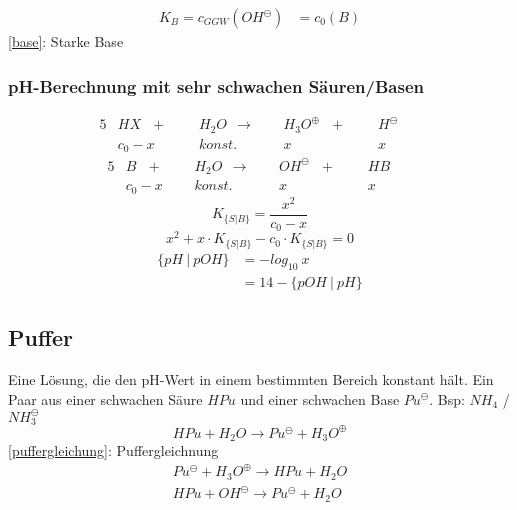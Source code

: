 {\large
	\begin{equation}
	\label{base}
	\begin{split}
	K_B=c_{GGW}(OH^\ominus) &= c_0(B)
	\end{split}
	\end{equation}	
}
\ref{base}: Starke Base
\subsubsection{pH-Berechnung mit sehr schwachen Säuren/Basen}

\begin{alignat*}{5}
	&HX \ \ \ +\ \ \ &&H_2O\ \ \rightarrow \ \ &&H_3O^\oplus \ \ \ +\ \ \ &&H^\ominus && \\
	&c_0 - x && konst. && x && x &&
\end{alignat*}
\begin{alignat*}{5}
	&B \ \ \ +\ \ \ &&H_2O\ \ \rightarrow \ \ &&OH^\ominus \ \ \ +\ \ \ &&HB && \\
	&c_0 - x && konst. && x && x &&
\end{alignat*}
{\large
	\begin{equation}
		K_{\{S|B\}} = \frac{x^2}{c_0-x}
	\end{equation}	
}
{\large
	\begin{equation}
	x^2 + x\cdot K_{\{S|B\}} - c_0 \cdot K_{\{S|B\}} = 0
	\end{equation}
}
{\large
	\begin{equation}
	\begin{split}
		\{pH\ |\ pOH\}&=-log_{10}\ x \\
		&=14-\{pOH\  |\  pH\}
	\end{split}
	\end{equation}
}
\subsection{Puffer}
Eine Lösung, die den pH-Wert in einem bestimmten Bereich konstant hält.
Ein Paar aus einer schwachen Säure $HPu$ und einer schwachen Base $Pu^\ominus$. Bsp: $NH_4$ / $NH_3^\ominus$
{\large
\begin{equation}
	\label{puffergleichung}
	HPu + H_2O \rightarrow Pu^\ominus + H_3O^\oplus	
\end{equation}
}
\ref{puffergleichung}: Puffergleichnung
{\large
	\begin{equation}
	\label{pufferausgleich}
	\begin{split}
	Pu^\ominus + H_3O^\oplus \rightarrow HPu + H_2O \\
	HPu + OH^\ominus \rightarrow Pu^\ominus + H_2O
	\end{split}
	\end{equation}
}


